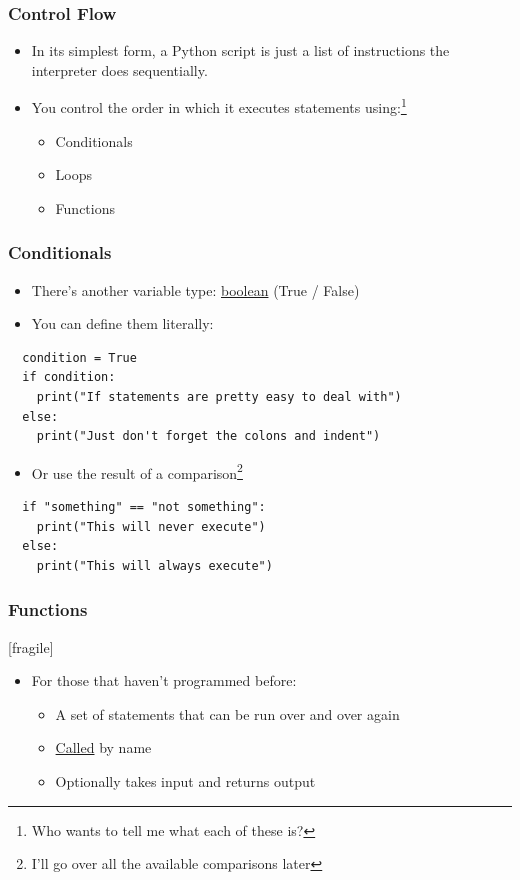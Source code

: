 \documentclass{beamer}
\begin{document}
\begin{frame}
  \frametitle{Control Flow}
  \begin{itemize}
    \item In its simplest form, a Python script is just a list of instructions
          the interpreter does sequentially.
    \pause
    \item You control the order in which it executes statements using:\footnote{Who wants to tell me what each of these is?}
    \begin{itemize}
      \item Conditionals
      \item Loops
      \item Functions
    \end{itemize}
  \end{itemize}
\end{frame}
\begin{frame}[fragile]
  \frametitle{Conditionals}
  \begin{itemize}
    \item There's another variable type: \underline{boolean} (True / False)
    \item You can define them literally:
  \end{itemize}
  \begin{verbatim}
  condition = True
  if condition:
    print("If statements are pretty easy to deal with")
  else:
    print("Just don't forget the colons and indent")
  \end{verbatim}
  \pause
  \begin{itemize}
    \item Or use the result of a comparison\footnote{I'll go over all the available comparisons later}
  \end{itemize}
  \begin{verbatim}
  if "something" == "not something":
    print("This will never execute")
  else:
    print("This will always execute")
  \end{verbatim}
\end{frame}
\begin{frame}
  \frametitle{Functions}[fragile]
  \begin{itemize}
    \item For those that haven't programmed before:
    \begin{itemize}
      \item A set of statements that can be run over and over again
      \item \underline{Called} by name
      \item Optionally takes input and returns output
    \end{itemize}
  \end{itemize}

\end{frame}
\end{document}
